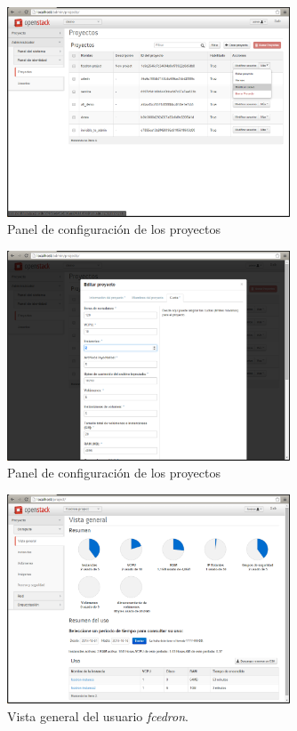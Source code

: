 \documentclass{article}
\begin{document}
\begin{figure}[h]
  \centering
    \includegraphics[width=0.75\textwidth]{img/m_075.png}
  \caption{Panel de configuración de los proyectos}
  \label{fig:AdminProjectModifyQuota}
\end{figure}	

\begin{figure}[h]
  \centering
    \includegraphics[width=0.75\textwidth]{img/m_076.png}
  \caption{Panel de configuración de los proyectos}
  \label{fig:AdminProjectModifyQuotaForm}
\end{figure}	

\begin{figure}[h]
  \centering
    \includegraphics[width=0.75\textwidth]{img/m_078.png}
  \caption{Vista general del usuario \emph{fcedron}.}
  \label{fig:UserFcedronPanel}
\end{figure}
\end{document}
